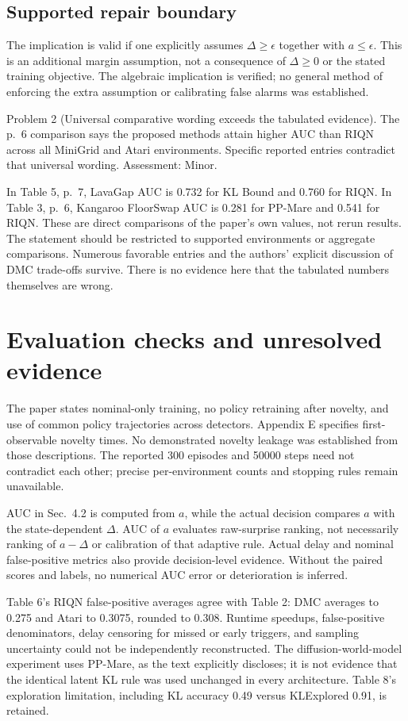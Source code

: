 \documentclass[10pt]{article}
\begin{document}
\subsection*{Supported repair boundary}
The implication is valid if one explicitly assumes \(\Delta\ge\epsilon\) together with \(a\le\epsilon\). This is an additional margin assumption, not a consequence of \(\Delta\ge0\) or the stated training objective. The algebraic implication is verified; no general method of enforcing the extra assumption or calibrating false alarms was established.\par
Problem 2 (Universal comparative wording exceeds the tabulated evidence).  The p. 6 comparison says the proposed methods attain higher AUC than RIQN across all MiniGrid and Atari environments. Specific reported entries contradict that universal wording. Assessment: Minor.\par
In Table 5, p. 7, LavaGap AUC is 0.732 for KL Bound and 0.760 for RIQN. In Table 3, p. 6, Kangaroo FloorSwap AUC is 0.281 for PP-Mare and 0.541 for RIQN. These are direct comparisons of the paper’s own values, not rerun results. The statement should be restricted to supported environments or aggregate comparisons. Numerous favorable entries and the authors’ explicit discussion of DMC trade-offs survive. There is no evidence here that the tabulated numbers themselves are wrong.\par
\section*{Evaluation checks and unresolved evidence}
The paper states nominal-only training, no policy retraining after novelty, and use of common policy trajectories across detectors. Appendix E specifies first-observable novelty times. No demonstrated novelty leakage was established from those descriptions. The reported 300 episodes and 50000 steps need not contradict each other; precise per-environment counts and stopping rules remain unavailable.\par
AUC in Sec. 4.2 is computed from \(a\), while the actual decision compares \(a\) with the state-dependent \(\Delta\). AUC of \(a\) evaluates raw-surprise ranking, not necessarily ranking of \(a-\Delta\) or calibration of that adaptive rule. Actual delay and nominal false-positive metrics also provide decision-level evidence. Without the paired scores and labels, no numerical AUC error or deterioration is inferred.\par
Table 6’s RIQN false-positive averages agree with Table 2: DMC averages to 0.275 and Atari to 0.3075, rounded to 0.308. Runtime speedups, false-positive denominators, delay censoring for missed or early triggers, and sampling uncertainty could not be independently reconstructed. The diffusion-world-model experiment uses PP-Mare, as the text explicitly discloses; it is not evidence that the identical latent KL rule was used unchanged in every architecture. Table 8’s exploration limitation, including KL accuracy 0.49 versus KLExplored 0.91, is retained.\par
\end{document}
